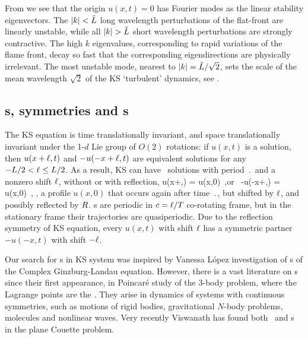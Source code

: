 From  we see that the origin $u(x,t) = 0$
has Fourier modes as the linear stability eigenvectors.
The $|k|<\tilde{L}$
long wavelength perturbations of the flat-front {\eqv}
are linearly unstable, while all
$|k|> \tildeL$ short wavelength perturbations are strongly contractive.
The high $k$ eigenvalues, corresponding to rapid variations of
the flame front, decay so fast that the corresponding eigendirections
are physically irrelevant.
The most unstable mode, nearest to $|k|=\tilde{L}/\sqrt{2}$,
sets the scale of the mean wavelength $\sqrt{2}$
of the KS `turbulent' dynamics,
see .

\subsection{\Rpo s, symmetries and \po s} \label{sec:KSePO}

The KS equation  is time translationally invariant,
and space translationally invariant
under the 1-$d$ Lie group of $O(2)$ rotations: if
$u(x,t)$ is a solution, then $u(x+\ell,t)$ and
$-u(-x+\ell,t)$ are equivalent
solutions for any $-L/2 < \ell \leq L/2$.
As a result, KS can have
\rpo\ solutions with period $\period{}$ and
a nonzero shift $\ell$, without or with reflection,
\beq
u(x+\shift,\period{}) = u(x,0)
\,,\qquad \mbox{or } \quad
-u(-x+\shift,\period{}) = u(x,0)
\,,
\ie, a profile $u(x,0)$ that occurs again after time $\period{}$,
but shifted by $\ell$, and possibly reflected by $R$.
{\Rpo s} are periodic in $c=\ell/{T_{}}$
co-rotating frame,
but in the stationary frame their trajectories
are quasiperiodic.
Due to the reflection symmetry  of KS equation,
every {\rpo}
$u(x,t)$ with shift $\ell$ has a symmetric partner
$-u(-x,t)$ with shift $-\ell$.

Our search for \rpo s in KS system was
inspired by Vanessa L{\'o}pez investigation
of {\rpo s} of the Complex Ginzburg-Landau equation.
However, there is a vast literature on
{\rpo s} since their first appearance,
in  Poincar\'e study of
the 3-body problem,
where the Lagrange points are the \reqva.
They arise in dynamics of systems
with continuous symmetries, such as motions of rigid bodies, gravitational
$N$-body problems, molecules and nonlinear waves.
Very recently Viswanath %
has found both \reqva\ and \rpo s in the plane Couette problem.

